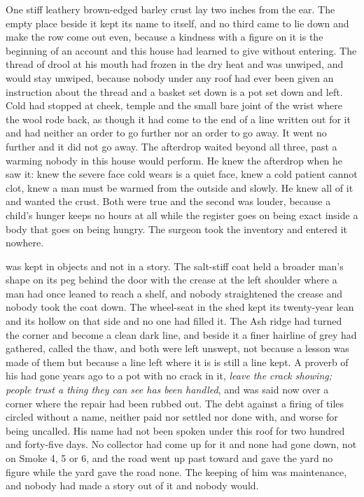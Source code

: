 One stiff leathery brown-edged barley crust lay two inches from the ear. The empty place beside it kept its name to itself, and no third came to lie down and make the row come out even, because a kindness with a figure on it is the beginning of an account and this house had learned to give without entering. The thread of drool at his mouth had frozen in the dry heat and was unwiped, and would stay unwiped, because nobody under any roof had ever been given an instruction about the thread and a basket set down is a pot set down and left. Cold had stopped at cheek, temple and the small bare joint of the wrist where the wool rode back, as though it had come to the end of a line written out for it and had neither an order to go further nor an order to go away. It went no further and it did not go away. The afterdrop waited beyond all three, past a warming nobody in this house would perform. He knew the afterdrop when he saw it: knew the severe face cold wears is a quiet face, knew a cold patient cannot clot, knew a man must be warmed from the outside and slowly. He knew all of it and wanted the crust. Both were true and the second was louder, because a child's hunger keeps no hours at all while the register goes on being exact inside a body that goes on being hungry. The surgeon took the inventory and entered it nowhere.

 was kept in objects and not in a story. The salt-stiff coat held a broader man's shape on its peg behind the door with the crease at the left shoulder where a man had once leaned to reach a shelf, and nobody straightened the crease and nobody took the coat down. The wheel-seat in the shed kept its twenty-year lean and its hollow on that side and no one had filled it. The Ash ridge had turned the corner and become a clean dark line, and beside it a finer hairline of grey had gathered, called the thaw, and both were left unswept, not because a lesson was made of them but because a line left where it is is still a line kept. A proverb of his had gone years ago to a pot with no crack in it, \emph{leave the crack showing; people trust a thing they can see has been handled}, and was said now over a corner where the repair had been rubbed out. The debt against a firing of tiles circled without a name, neither paid nor settled nor done with, and worse for being uncalled. His name had not been spoken under this roof for two hundred and forty-five days. No collector had come up  for it and none had gone down, not on Smoke 4, 5 or 6, and the road went up past  toward  and gave the yard no figure while the yard gave the road none. The keeping of him was maintenance, and nobody had made a story out of it and nobody would.


